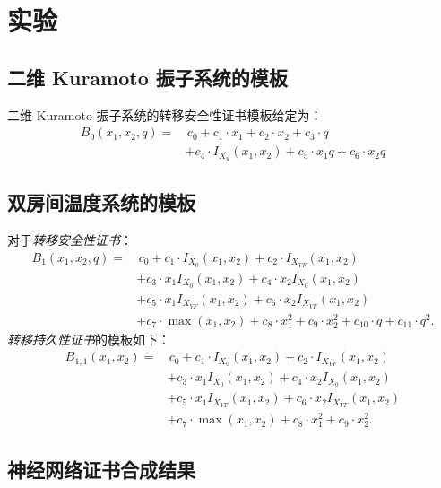 \section{实验}
\label{appendix-experiment}
\subsection{二维 Kuramoto 振子系统的模板}
二维 Kuramoto 振子系统的转移安全性证书模板给定为：
\begin{align*}
B_0(x_1, x_2, q) = &\, c_0 + c_1 \cdot x_1 + c_2 \cdot x_2 + c_3 \cdot q \\
                   &+ c_4 \cdot I_{X_u}(x_1, x_2) + c_5 \cdot x_1 q + c_6 \cdot x_2 q
\end{align*}

\subsection{双房间温度系统的模板}
对于\textit{转移安全性证书}：
\begin{align*}
B_1(x_1, x_2, q) = &\, c_0 + c_1 \cdot I_{X_0}(x_1, x_2) + c_2 \cdot I_{X_{VF}}(x_1, x_2) \\
                   &+ c_3 \cdot x_1 I_{X_0}(x_1, x_2) + c_4 \cdot x_2 I_{X_0}(x_1, x_2) \\
                   &+ c_5 \cdot x_1 I_{X_{VF}}(x_1, x_2) + c_6 \cdot x_2 I_{X_{VF}}(x_1, x_2) \\
                   &+ c_7 \cdot \max(x_1, x_2) + c_8 \cdot x_1^2 + c_9 \cdot x_2^2 + c_{10} \cdot q + c_{11} \cdot q^2.
\end{align*}
\textit{转移持久性证书}的模板如下：
\begin{align*}
B_{1,1}(x_1, x_2) = & \, c_0 + c_1 \cdot I_{X_0}(x_1, x_2) + c_2 \cdot I_{X_{VF}}(x_1, x_2) \\
                    & + c_3 \cdot x_1 I_{X_0}(x_1, x_2) + c_4 \cdot x_2 I_{X_0}(x_1, x_2) \\
                    & + c_5 \cdot x_1 I_{X_{VF}}(x_1, x_2) + c_6 \cdot x_2 I_{X_{VF}}(x_1, x_2) \\ 
                    & + c_7 \cdot \max(x_1, x_2) + c_8 \cdot x_1^2 + c_9 \cdot x_2^2.
\end{align*}

\subsection{神经网络证书合成结果}
\label{app:neural_cert_results}


